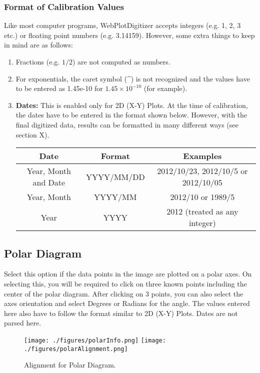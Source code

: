 \documentclass[letterpaper, 10pt]{article}
\begin{document}
\subsubsection{Format of Calibration Values}
Like most computer programs, WebPlotDigitizer accepts integers (e.g. 1, 2, 3 etc.) or floating point numbers (e.g. 3.14159). However, some extra things to keep in mind are as follows:
\begin{enumerate}
\item{Fractions (e.g. $1/2$) are not computed as numbers.}
\item{For exponentials, the caret symbol (\^{}) is not recognized and the values have to be entered as 1.45e-10 for $1.45 \times 10^{-10}$ (for example).}
\item{{\bf Dates:} This is enabled only for 2D (X-Y) Plots. At the time of calibration, the dates have to be entered in the format shown below. However, with the final digitized data, results can be formatted in many different ways (see section X).
\begin{center}
\begin{tabular}{|c|c|c|}
\hline
Date & Format & Examples\\
\hline
Year, Month and Date & YYYY/MM/DD & 2012/10/23, 2012/10/5 or 2012/10/05\\
Year, Month & YYYY/MM & 2012/10 or 1989/5\\
Year & YYYY & 2012 (treated as any integer)\\
\hline
\end{tabular}
\end{center}
}
\end{enumerate}





\subsection{Polar Diagram}
Select this option if the data points in the image are plotted on a polar axes. On selecting this, you will be required to click on three known points including the center of the polar diagram. After clicking on 3 points, you can also select the axes orientation and select Degrees or Radians for the angle. The values entered here also have to follow the format similar to 2D (X-Y) Plots. Dates are not parsed here.

\begin{figure}
\begin{center}
\texttt{[image: ./figures/polarInfo.png]}
\texttt{[image: ./figures/polarAlignment.png]}
\caption{Alignment for Polar Diagram.}
\label{fig:polarAlignment}
\end{center}
\end{figure}
 
\end{document}
